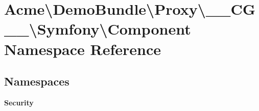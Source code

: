 \section{Acme\textbackslash{}Demo\+Bundle\textbackslash{}Proxy\textbackslash{}\+\_\+\+\_\+\+C\+G\+\_\+\+\_\+\textbackslash{}Symfony\textbackslash{}Component Namespace Reference}
\label{namespace_acme_1_1_demo_bundle_1_1_proxy_1_1_____c_g_____1_1_symfony_1_1_component}
\subsection*{Namespaces}
\begin{DoxyCompactItemize}
\item 
 {\bf Security}
\end{DoxyCompactItemize}
